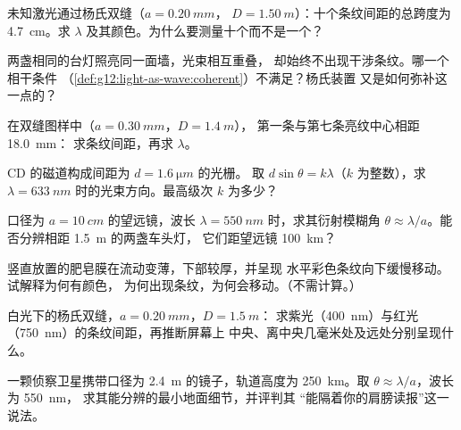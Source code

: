 \begin{exercise}[$\star\star$]\label{exo:g12:light-as-wave:7}
未知激光通过杨氏双缝（$a = \qty{0.20}{mm}$，
$D = \qty{1.50}{m}$）：十个条纹间距的总跨度为 \qty{4.7}{cm}。求
$\lambda$ 及其颜色。为什么要测量十个而不是一个？
\end{exercise}

\begin{exercise}[$\star\star$]\label{exo:g12:light-as-wave:8}
两盏相同的台灯照亮同一面墙，光束相互重叠，
却始终不出现干涉条纹。哪一个相干条件
（\cref{def:g12:light-as-wave:coherent}）不满足？杨氏装置
又是如何弥补这一点的？
\end{exercise}

\begin{exercise}[$\star\star$]\label{exo:g12:light-as-wave:9}
在双缝图样中（$a = \qty{0.30}{mm}$，$D = \qty{1.4}{m}$），
第一条与第七条亮纹中心相距 \qty{18.0}{mm}：
求条纹间距，再求 $\lambda$。
\end{exercise}

\begin{exercise}[$\star\star$]\label{exo:g12:light-as-wave:10}
CD 的磁道构成间距为 $d = \qty{1.6}{\micro m}$ 的光栅。
取 $d \sin\theta = k\lambda$（$k$ 为整数），求
$\lambda = \qty{633}{nm}$ 时的光束方向。最高级次 $k$ 为多少？
\end{exercise}

\begin{exercise}[$\star\star$]\label{exo:g12:light-as-wave:11}
口径为 $a = \qty{10}{cm}$ 的望远镜，波长 $\lambda =
\qty{550}{nm}$ 时，求其衍射模糊角 $\theta \approx
\lambda/a$。能否分辨相距 \qty{1.5}{m} 的两盏车头灯，
它们距望远镜 \qty{100}{km}？
\end{exercise}

\begin{exercise}[$\star\star\star$]\label{exo:g12:light-as-wave:12}
竖直放置的肥皂膜在流动变薄，下部较厚，并呈现
水平彩色条纹向下缓慢移动。试解释为何有颜色，
为何出现条纹，为何会移动。（不需计算。）
\end{exercise}

\begin{exercise}[$\star\star\star$]\label{exo:g12:light-as-wave:13}
白光下的杨氏双缝，$a = \qty{0.20}{mm}$，$D = \qty{1.5}{m}$：
求紫光（\qty{400}{nm}）与红光
（\qty{750}{nm}）的条纹间距，再推断屏幕上
中央、离中央几毫米处及远处分别呈现什么。
\end{exercise}

\begin{exercise}[$\star\star\star$]\label{exo:g12:light-as-wave:14}
一颗侦察卫星携带口径为 \qty{2.4}{m} 的镜子，轨道高度为
\qty{250}{km}。取 $\theta \approx \lambda/a$，波长为 \qty{550}{nm}，
求其能分辨的最小地面细节，并评判其
“能隔着你的肩膀读报”这一说法。
\end{exercise}

